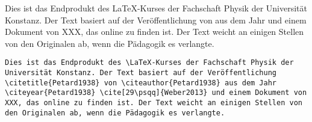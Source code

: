 \documentclass["WS\space 16-17\space -\space LaTeX-Kurs\space -\space Praesentation\space -\space 3.tex"]{subfiles}
\begin{document}
\begin{frame}[fragile]
	\Losung
	\begin{outputbox}
		Dies ist das Endprodukt des \LaTeX-Kurses der Fachschaft Physik der Universität Konstanz. Der Text basiert auf der Veröffentlichung  von \citeauthor{Petard1938} aus dem Jahr \citeyear{Petard1938} \cite[29\psqq]{Weber2013} und einem Dokument von XXX, das online zu finden ist. Der Text weicht an einigen Stellen von den Originalen ab, wenn die Pädagogik es verlangte.
	\end{outputbox}

	\Code
	\begin{lstlisting}
Dies ist das Endprodukt des \LaTeX-Kurses der Fachschaft Physik der Universität Konstanz. Der Text basiert auf der Veröffentlichung \citetitle{Petard1938} von \citeauthor{Petard1938} aus dem Jahr \citeyear{Petard1938} \cite[29\psqq]{Weber2013} und einem Dokument von XXX, das online zu finden ist. Der Text weicht an einigen Stellen von den Originalen ab, wenn die Pädagogik es verlangte.	
	\end{lstlisting}
\end{frame}
\end{document}
